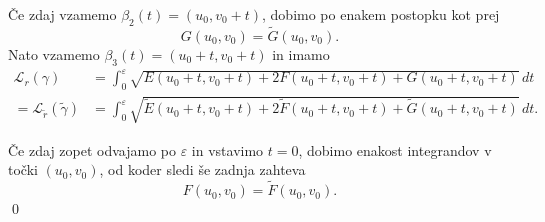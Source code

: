 Če zdaj vzamemo $\beta_2(t) = (u_0, v_0 + t)$, dobimo po enakem postopku kot prej 
\begin{equation*} G(u_0, v_0) = \tilde{G}(u_0, v_0). \end{equation*}
Nato vzamemo $\beta_3(t) = (u_0 + t, v_0 + t)$ in imamo
\begin{align*}
  \mathcal{L}_r(\gamma) &= \int_{0}^{\varepsilon} \sqrt{E(u_0 + t, v_0 + t) + 2F(u_0 + t, v_0 + t) + G(u_0 + t, v_0 + t)}   \, dt  \\
  = \mathcal{L}_{\tilde{r}}(\tilde{\gamma}) &= \int_{0}^{\varepsilon} \sqrt{\tilde{E}(u_0 + t, v_0 + t) + 2\tilde{F}(u_0 + t, v_0 + t) + \tilde{G}(u_0 + t, v_0 + t)}   \, dt. 
\end{align*}

Če zdaj zopet odvajamo po $\varepsilon$ in vstavimo $t = 0$, dobimo enakost integrandov v točki $(u_0, v_0)$, od koder sledi še zadnja zahteva
\begin{equation*} F(u_0, v_0) = \tilde{F}(u_0, v_0). \end{equation*}
\qed

